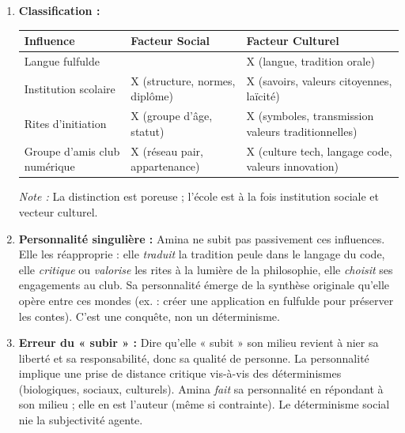 \documentclass[11pt]{article}
\newcommand{\cle}[1]{{\popxbold\color{popdark}#1}}
\begin{document}
\begin{corrige}
\begin{enumerate}
    \item \textbf{Classification :}
    \begin{center}
        \begin{tabularx}{\linewidth}{|l|X|X|}\hline
        \textbf{Influence} & \textbf{Facteur Social} & \textbf{Facteur Culturel} \\ \hline
        Langue fulfulde & & X (langue, tradition orale) \\ \hline
        Institution scolaire & X (structure, normes, diplôme) & X (savoirs, valeurs citoyennes, laïcité) \\ \hline
        Rites d'initiation & X (groupe d'âge, statut) & X (symboles, transmission valeurs traditionnelles) \\ \hline
        Groupe d'amis club numérique & X (réseau pair, appartenance) & X (culture tech, langage code, valeurs innovation) \\ \hline
        \end{tabularx}
    \end{center}
    \textit{Note :} La distinction est poreuse ; l'école est à la fois institution sociale et vecteur culturel.
    \item \textbf{Personnalité singulière :} Amina ne subit pas passivement ces influences. Elle les \cle{réapproprie} : elle \emph{traduit} la tradition peule dans le langage du code, elle \emph{critique} ou \emph{valorise} les rites à la lumière de la philosophie, elle \emph{choisit} ses engagements au club. Sa personnalité émerge de la \cle{synthèse originale} qu'elle opère entre ces mondes (ex. : créer une application en fulfulde pour préserver les contes). C'est une \cle{conquête}, non un déterminisme.
    \item \textbf{Erreur du « subir » :} Dire qu'elle « subit » son milieu revient à nier sa \cle{liberté} et sa \cle{responsabilité}, donc sa qualité de \cle{personne}. La personnalité implique une \cle{prise de distance} critique vis-à-vis des déterminismes (biologiques, sociaux, culturels). Amina \emph{fait} sa personnalité en répondant à son milieu ; elle en est l'\cle{auteur} (même si contrainte). Le déterminisme social nie la subjectivité agente.
\end{enumerate}
\end{corrige}
\end{document}
